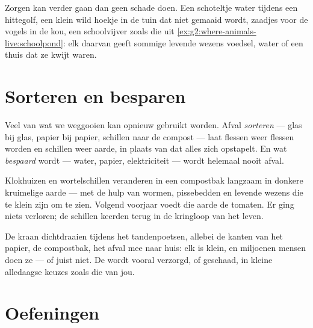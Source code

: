 \begin{example}\label{ex:g2:caring-for-nature:help}
Zorgen kan verder gaan dan geen schade doen. Een schoteltje water
tijdens een hittegolf, een klein wild hoekje in de tuin dat niet gemaaid
wordt, zaadjes voor de vogels in de kou, een schoolvijver zoals die uit
\cref{ex:g2:where-animals-live:schoolpond}: elk daarvan geeft sommige
levende wezens voedsel, water of een thuis dat ze kwijt waren.
\end{example}

\section{Sorteren en besparen}

\begin{proposition}\label{prop:g2:caring-for-nature:recycle}
Veel van wat we weggooien kan opnieuw gebruikt worden. Afval
\emph{sorteren} --- glas bij glas, papier bij
papier, schillen naar de compost --- laat flessen weer flessen worden
en schillen weer aarde, in plaats van dat alles zich opstapelt. En wat
\emph{bespaard} wordt --- water, papier, elektriciteit --- wordt
helemaal nooit afval.
\end{proposition}
\admitted

\begin{example}[De compostbak]\label{ex:g2:caring-for-nature:compost}
Klokhuizen en wortelschillen veranderen in een compostbak langzaam in
donkere kruimelige aarde --- met de hulp van wormen, pissebedden en
levende wezens die te klein zijn om te zien. Volgend voorjaar voedt die
aarde de tomaten. Er ging niets verloren; de schillen keerden terug in
de kringloop van het leven.
\end{example}

\begin{remark}\label{rem:g2:caring-for-nature:count}
De kraan dichtdraaien tijdens het tandenpoetsen, allebei de kanten van
het papier, de compostbak, het afval mee naar huis: elk is klein, en
miljoenen mensen doen ze --- of juist niet. De  wordt vooral
verzorgd, of geschaad, in kleine alledaagse keuzes zoals die van jou.
\end{remark}

\section{Oefeningen}

